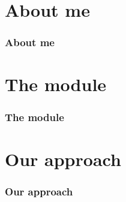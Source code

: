 \documentclass{beamer}
\begin{document}
\section{About me}

\begin{frame}
\frametitle{About me}
\end{frame}

\section{The module}

\begin{frame}
\frametitle{The module}
\end{frame}


\section{Our approach}

\begin{frame}
\frametitle{Our approach}

\end{frame}
\end{document}
